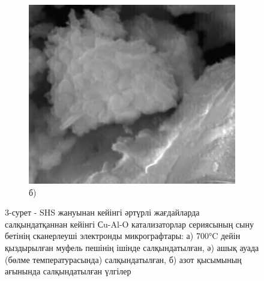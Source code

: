 \begin{figure}[H]
\begin{subfigure}[b]{0.32\textwidth}
    \end{subfigure}
    \begin{subfigure}[b]{0.32\textwidth}
        \centering
        \includegraphics[width=\textwidth]{assets/73}
        \caption*{б)}
    \end{subfigure}
    \caption*{3-сурет - SHS жануынан кейінгі әртүрлі жағдайларда салқындатқаннан кейінгі Сu-Al-O катализаторлар сериясының сыну бетінің сканерлеуші электронды микрографтары: а) 700°C дейін қыздырылған муфель пешінің ішінде салқындатылған, ә) ашық ауада (бөлме температурасында) салқындатылған, б) азот қысымының ағынында салқындатылған үлгілер}
\end{figure}

